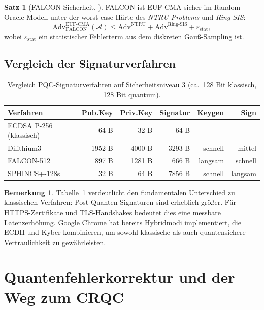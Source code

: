 ﻿\documentclass[a4paper,12pt]{article}
\theoremstyle{definition}
\newtheorem{bemerkung}{Bemerkung}[section]
\newtheorem{satz}{Satz}[section]
\begin{document}
\begin{satz}[FALCON-Sicherheit, \cite{PFH+22}]
FALCON ist EUF-CMA-sicher im Random-Oracle-Modell unter der worst-case-Härte
des \emph{NTRU-Problems} und \emph{Ring-SIS}:
\[
  \mathrm{Adv}^{\mathrm{EUF\text{-}CMA}}_{\mathrm{FALCON}}(\mathcal{A})
  \leq \mathrm{Adv}^{\mathrm{NTRU}} + \mathrm{Adv}^{\mathrm{Ring\text{-}SIS}} + \varepsilon_\mathrm{stat},
\]
wobei $\varepsilon_\mathrm{stat}$ ein statistischer Fehlerterm aus dem
diskreten Gauß-Sampling ist.
\end{satz}

\subsection{Vergleich der Signaturverfahren}

\begin{table}[H]
\centering
\caption{Vergleich PQC-Signaturverfahren auf Sicherheitsniveau 3 (ca.\ 128 Bit klassisch, 128 Bit quantum).}
\label{tab:sigcomp}
\begin{tabular}{lrrrrr}
\toprule
Verfahren & Pub.Key & Priv.Key & Signatur & Keygen & Sign\\
\midrule
ECDSA P-256 (klassisch)  & 64 B   & 32 B   & 64 B    & -- & --\\
\midrule
Dilithium3   & 1952 B  & 4000 B  & 3293 B  & schnell & mittel\\
FALCON-512   & 897 B   & 1281 B  & 666 B   & langsam & schnell\\
SPHINCS+-128s & 32 B   & 64 B    & 7856 B  & schnell & langsam\\
\bottomrule
\end{tabular}
\end{table}

\begin{bemerkung}
Tabelle~\ref{tab:sigcomp} verdeutlicht den fundamentalen Unterschied zu klassischen
Verfahren: Post-Quanten-Signaturen sind erheblich größer. Für HTTPS-Zertifikate
und TLS-Handshakes bedeutet dies eine messbare Latenzerhöhung. Google Chrome
hat bereits Hybridmodi implementiert, die ECDH und Kyber kombinieren, um
sowohl klassische als auch quantensichere Vertraulichkeit zu gewährleisten.
\end{bemerkung}

\section{Quantenfehlerkorrektur und der Weg zum CRQC}
\end{document}
